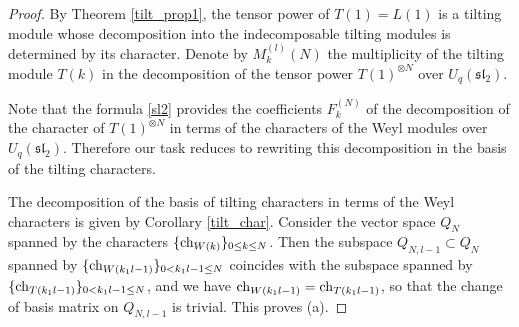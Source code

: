 \documentclass[11pt]{amsart}
\newcommand\lie[1]{\mathfrak{#1}}
\begin{document}
\begin{proof} 
By Theorem \ref{tilt_prop1}, the tensor power of $T(1)  = L(1)$ is a tilting module whose decomposition into the indecomposable tilting modules is determined by its character. Denote by $M_{k}^{(l)}(N)$ the multiplicity of the tilting module $T(k)$ in the decomposition of the tensor power $T(1)^{\otimes N}$ over $U_q(\lie{sl}_2)$. 

Note that the formula \ref{sl2} provides the coefficients $F_k^{(N)}$ of the decomposition of the character of $T(1)^{\otimes N}$ in terms of the characters of the Weyl modules over $U_q(\lie{sl}_2)$. Therefore our task reduces to rewriting this decomposition in the basis of the tilting characters. 

The decomposition of the basis of tilting characters in terms of the Weyl characters is given by Corollary  \ref{tilt_char}. Consider the vector space $Q_N$ spanned by the characters $\{ {\rm ch}_{W(k)} \}_{0 \leq k \leq N}$.  
Then the subspace $Q_{N, l-1} \subset Q_N$ spanned by $\{{\rm ch}_{W(k_1l-1)}\}_{0 < k_1l-1 \leq N}$ coincides with the subspace spanned by $\{{\rm ch}_{T(k_1l-1)}\}_{0 < k_1l-1 \leq N}$, 
and we have ${\rm ch}_{W(k_1l -1)} = {\rm ch}_{T(k_1l -1)}$, so that the change of basis matrix on $Q_{N, l-1}$ is trivial. This proves (a). 
 

\end{proof}
\end{document}
